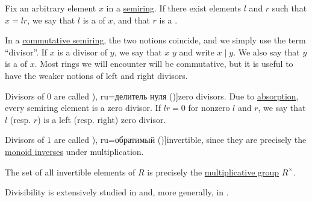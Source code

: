 \begin{definition}\label{def:divisibility}
  Fix an arbitrary element \( x \) in a \hyperref[def:semiring]{semiring}. If there exist elements \( l \) and \( r \) such that \( x = lr \), we say that \( l \) is a  of \( x \), and that \( r \) is a .

  In a \hyperref[def:semiring/commutative]{commutative semiring}, the two notions coincide, and we simply use the term \enquote{divisor}. If \( x \) is a divisor of \( y \), we say that \( x \)  \( y \) and write \( x \mid y \). We also say that \( y \) is a  of \( x \). Most rings we will encounter will be commutative, but it is useful to have the weaker notions of left and right divisors.

  \begin{thmenum}
     Divisors of \( 0 \) are called \term[bg=делител на нулата (\cite[def. V.2]{ГеновМиховскиМоллов1991}), ru=делитель нуля (\cite[20]{Винберг2014})]{zero divisors}. Due to \hyperref[def:semiring/absorption]{absorption}, every semiring element is a zero divisor. If \( lr = 0 \) for nonzero \( l \) and \( r \), we say that \( l \) (resp. \( r \)) is a  left (resp. right) zero divisor.

     Divisors of \( 1 \) are called \term[bg=обратим (\cite[def. V.3]{ГеновМиховскиМоллов1991}), ru=обратимый (\cite[20]{Винберг2014})]{invertible}, since they are precisely the \hyperref[def:monoid_inverse]{monoid inverses} under multiplication.
  \end{thmenum}
\end{definition}
\begin{comments}
  \item The set of all invertible elements of \( R \) is precisely the \hyperref[def:semiring]{multiplicative group} \( R^\times \).
  \item Divisibility is extensively studied in  and, more generally, in .
\end{comments}

